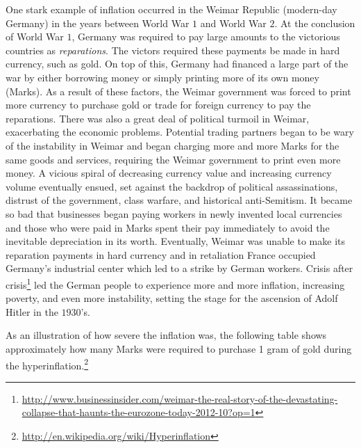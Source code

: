 \documentclass{ximera}
\begin{document}
One stark example of inflation occurred in the Weimar Republic (modern-day Germany) in the years between World War $1$ and World War $2$. At the conclusion of World War $1$, Germany was required to pay large amounts to the victorious countries as \emph{reparations}. The victors required these payments be made in hard currency, such as gold. On top of this, Germany had financed a large part of the war by either borrowing money or simply printing more of its own money (Marks). As a result of these factors, the Weimar government was forced to print more currency to purchase gold or trade for foreign currency to pay the reparations. There was also a great deal of political turmoil in Weimar, exacerbating the economic problems. Potential trading partners began to be wary of the instability in Weimar and began charging more and more Marks for the same goods and services, requiring the Weimar government to print even more money. A vicious spiral of decreasing currency value and increasing currency volume eventually ensued, set against the backdrop of political assassinations, distrust of the government, class warfare, and historical anti-Semitism. It became so bad that businesses began paying workers in newly invented local currencies and those who were paid in Marks spent their pay immediately to avoid the inevitable depreciation in its worth. Eventually, Weimar was unable to make its reparation payments in hard currency and in retaliation France occupied Germany's industrial center which led to a strike by German workers. Crisis after crisis\footnote{\href{http://www.businessinsider.com/weimar-the-real-story-of-the-devastating-collapse-that-haunts-the-eurozone-today-2012-10?op=1}{http://www.businessinsider.com/weimar-the-real-story-of-the-devastating-collapse-that-haunts-the-eurozone-today-2012-10?op=1}} led the German people to experience more and more inflation, increasing poverty, and even more instability, setting the stage for the ascension of Adolf Hitler in the $1930$'s.

As an illustration of how severe the inflation was, the following table shows approximately how many Marks were required to purchase 1 gram of gold during the hyperinflation.\footnote{\href{http://en.wikipedia.org/wiki/Hyperinflation}{http://en.wikipedia.org/wiki/Hyperinflation}}
\end{document}
